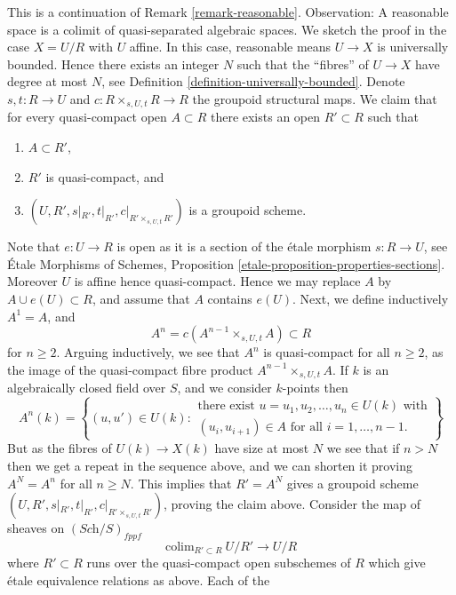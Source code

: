 \begin{remark}
\label{remark-fun-property-reasonable}
This is a continuation of Remark \ref{remark-reasonable}.
Observation: A reasonable space is a colimit of quasi-separated
algebraic spaces. We sketch the proof in the case $X = U/R$ with $U$ affine.
In this case, reasonable means $U \to X$ is universally bounded.
Hence there exists an integer $N$ such that the ``fibres'' of $U \to X$
have degree at most $N$, see
Definition \ref{definition-universally-bounded}.
Denote $s, t : R \to U$ and $c : R \times_{s, U, t} R \to R$ the
groupoid structural maps.
We claim that for every quasi-compact open $A \subset R$ there exists
an open $R' \subset R$ such that
\begin{enumerate}
\item $A \subset R'$,
\item $R'$ is quasi-compact, and
\item $(U, R', s|_{R'}, t|_{R'}, c|_{R' \times_{s, U, t} R'})$ is
a groupoid scheme.
\end{enumerate}
Note that $e : U \to R$ is open as it is a section of the \'etale morphism
$s : R \to U$, see
\'Etale Morphisms of Schemes,
Proposition \ref{etale-proposition-properties-sections}. Moreover
$U$ is affine hence quasi-compact. Hence we may replace $A$ by
$A \cup e(U) \subset R$, and assume that $A$ contains $e(U)$. Next, we
define inductively $A^1 = A$, and
$$
A^n = c(A^{n - 1} \times_{s, U, t} A) \subset R
$$
for $n \geq 2$. Arguing inductively, we see that $A^n$ is quasi-compact for
all $n \geq 2$, as the image of the quasi-compact fibre product
$A^{n - 1} \times_{s, U, t} A$. If $k$ is an algebraically
closed field over $S$, and we consider $k$-points then
$$
A^n(k) = \left\{(u, u') \in U(k)
:
\begin{matrix}
\text{there exist } u = u_1, u_2, \ldots, u_n \in U(k)\text{ with} \\
(u_i , u_{i + 1}) \in A \text{ for all }i = 1, \ldots, n - 1.
\end{matrix}
\right\}
$$
But as the fibres of $U(k) \to X(k)$ have size at most $N$ we see that if
$n > N$ then we get a repeat in the sequence above, and we can shorten it
proving $A^N = A^n$ for all $n \geq N$.
This implies that $R' = A^N$ gives a groupoid scheme
$(U, R', s|_{R'}, t|_{R'}, c|_{R' \times_{s, U, t} R'})$, proving the claim
above. Consider the map of sheaves on $(\textit{Sch}/S)_{fppf}$
$$
\text{colim}_{R' \subset R}\ U/R' \longrightarrow U/R
$$
where $R' \subset R$ runs over the quasi-compact open subschemes
of $R$ which give \'etale equivalence relations as above. Each of the

\end{remark}
